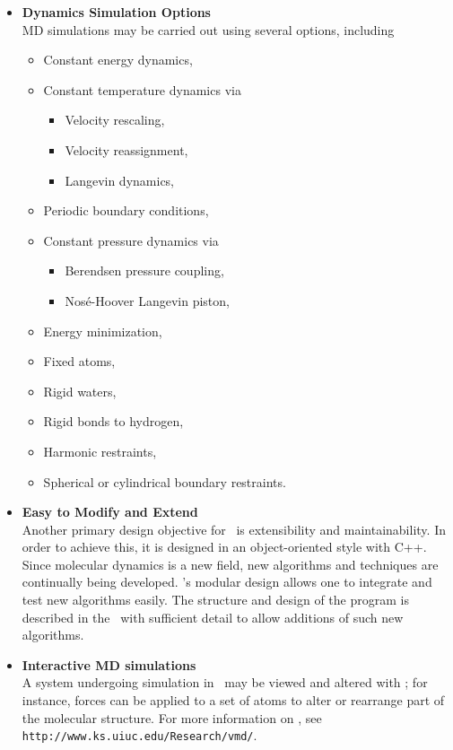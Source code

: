\begin{itemize}
\item{\bf Dynamics Simulation Options}\\
MD simulations may be carried out using several options, including
\begin{itemize}
  \item Constant energy dynamics,
  \item Constant temperature dynamics via
  \begin{itemize}
    \item Velocity rescaling,
    \item Velocity reassignment,
    \item Langevin dynamics,
  \end{itemize}
  \item Periodic boundary conditions,
  \item Constant pressure dynamics via
  \begin{itemize}
    \item Berendsen pressure coupling,
    \item Nos\'{e}-Hoover Langevin piston,
  \end{itemize}
  \item Energy minimization,
  \item Fixed atoms,
  \item Rigid waters,
  \item Rigid bonds to hydrogen,
  \item Harmonic restraints,
  \item Spherical or cylindrical boundary restraints.
\end{itemize}

\item{\bf Easy to Modify and Extend}\\
Another primary design objective for \NAMD\ is extensibility and 
maintainability. In order to achieve this, it is designed in an 
object-oriented style with C++. Since molecular dynamics is a new field,
new algorithms and techniques are continually being developed.
\NAMD's modular design allows one to integrate and test new algorithms 
easily.  The structure and design of the program 
is described in the \PG\ with sufficient
detail to allow additions of such
new algorithms.

\item{\bf Interactive MD simulations}\\
A system undergoing simulation in \NAMD\ may be viewed and
altered with \VMD; for instance, forces can be applied to a set of atoms
to alter or rearrange part of the molecular structure.  For more information
on \VMD, see {\tt http://www.ks.uiuc.edu/Research/vmd/}.  


\end{itemize}
